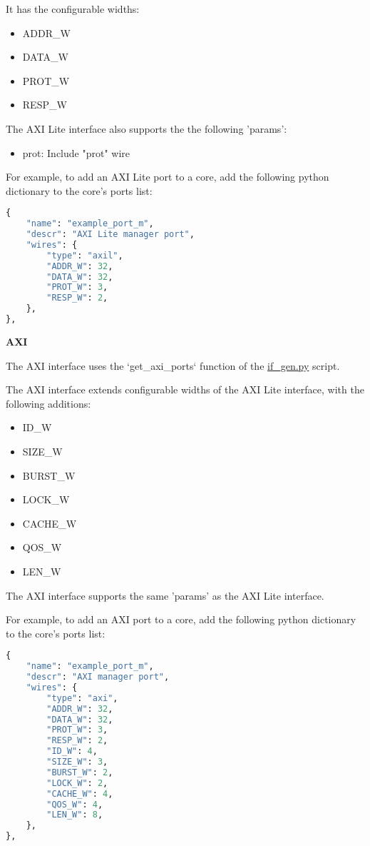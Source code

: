 
It has the configurable widths: 
\begin{itemize}
  \item ADDR\_W
  \item DATA\_W
  \item PROT\_W
  \item RESP\_W
\end{itemize}

The AXI Lite interface also supports the the following 'params':
\begin{itemize}
  \item prot: Include "prot" wire
\end{itemize}

For example, to add an AXI Lite port to a core, add the following python dictionary to the core's ports list:
\begin{lstlisting}[language=python]
{
	"name": "example_port_m",
	"descr": "AXI Lite manager port",
	"wires": {
		"type": "axil",
		"ADDR_W": 32,
		"DATA_W": 32,
		"PROT_W": 3,
		"RESP_W": 2,
	},
},
\end{lstlisting}


%
%
\clearpage
\large\textbf{AXI}

The AXI interface uses the `get\_axi\_ports` function of the \href{https://github.com/IObundle/py2hwsw/blob/main/py2hwsw/scripts/if_gen.py}{if\_gen.py} script.


The AXI interface extends configurable widths of the AXI Lite interface, with the following additions:
\begin{itemize}
  \item ID\_W
  \item SIZE\_W
  \item BURST\_W
  \item LOCK\_W
  \item CACHE\_W
  \item QOS\_W
  \item LEN\_W
\end{itemize}

The AXI interface supports the same 'params' as the AXI Lite interface.

For example, to add an AXI port to a core, add the following python dictionary to the core's ports list:
\begin{lstlisting}[language=python]
{
	"name": "example_port_m",
	"descr": "AXI manager port",
	"wires": {
		"type": "axi",
		"ADDR_W": 32,
		"DATA_W": 32,
		"PROT_W": 3,
		"RESP_W": 2,
		"ID_W": 4,
		"SIZE_W": 3,
		"BURST_W": 2,
		"LOCK_W": 2,
		"CACHE_W": 4,
		"QOS_W": 4,
		"LEN_W": 8,
	},
},
\end{lstlisting}


